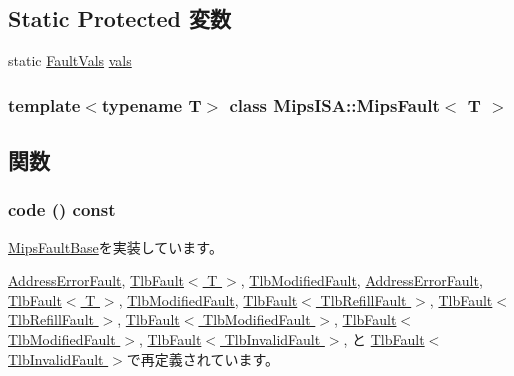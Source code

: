 \subsection*{Static Protected 変数}
\begin{DoxyCompactItemize}
\item 
static \hyperlink{structMipsISA_1_1MipsFaultBase_1_1FaultVals}{FaultVals} \hyperlink{classMipsISA_1_1MipsFault_a60c641152aa40196c3b544f1e0f2d567}{vals}
\end{DoxyCompactItemize}
\subsubsection*{template$<$typename T$>$ class MipsISA::MipsFault$<$ T $>$}



\subsection{関数}
\hypertarget{classMipsISA_1_1MipsFault_a1dd20a2460d7723d3eaa287b7cc07e79}{
\subsubsection[{code}]{ code () const}}
\label{classMipsISA_1_1MipsFault_a1dd20a2460d7723d3eaa287b7cc07e79}


\hyperlink{classMipsISA_1_1MipsFaultBase_a61bd3af5e2aa0d5447807e9fe98769be}{MipsFaultBase}を実装しています。

\hyperlink{classMipsISA_1_1AddressErrorFault_a1dd20a2460d7723d3eaa287b7cc07e79}{AddressErrorFault}, \hyperlink{classMipsISA_1_1TlbFault_a1dd20a2460d7723d3eaa287b7cc07e79}{TlbFault$<$ T $>$}, \hyperlink{classMipsISA_1_1TlbModifiedFault_a1dd20a2460d7723d3eaa287b7cc07e79}{TlbModifiedFault}, \hyperlink{classMipsISA_1_1AddressErrorFault_a1dd20a2460d7723d3eaa287b7cc07e79}{AddressErrorFault}, \hyperlink{classMipsISA_1_1TlbFault_a1dd20a2460d7723d3eaa287b7cc07e79}{TlbFault$<$ T $>$}, \hyperlink{classMipsISA_1_1TlbModifiedFault_a1dd20a2460d7723d3eaa287b7cc07e79}{TlbModifiedFault}, \hyperlink{classMipsISA_1_1TlbFault_a1dd20a2460d7723d3eaa287b7cc07e79}{TlbFault$<$ TlbRefillFault $>$}, \hyperlink{classMipsISA_1_1TlbFault_a1dd20a2460d7723d3eaa287b7cc07e79}{TlbFault$<$ TlbRefillFault $>$}, \hyperlink{classMipsISA_1_1TlbFault_a1dd20a2460d7723d3eaa287b7cc07e79}{TlbFault$<$ TlbModifiedFault $>$}, \hyperlink{classMipsISA_1_1TlbFault_a1dd20a2460d7723d3eaa287b7cc07e79}{TlbFault$<$ TlbModifiedFault $>$}, \hyperlink{classMipsISA_1_1TlbFault_a1dd20a2460d7723d3eaa287b7cc07e79}{TlbFault$<$ TlbInvalidFault $>$}, と \hyperlink{classMipsISA_1_1TlbFault_a1dd20a2460d7723d3eaa287b7cc07e79}{TlbFault$<$ TlbInvalidFault $>$}で再定義されています。


